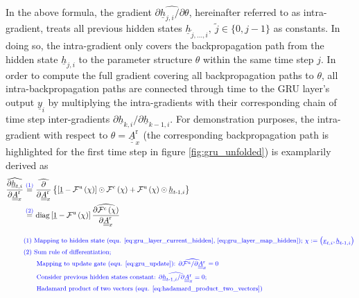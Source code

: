 In the above formula,
the gradient
$\widehat{\partial \underline h_{j, i} / \partial \theta}$,
hereinafter referred to as intra-gradient,
treats all previous hidden states 
$\underline h_{\tilde j,\dots, i}, \ \tilde j \in \{0, j-1\}$ as constants.
In doing so, the intra-gradient only covers 
the backpropagation path from 
the hidden state $\underline h_{j, i}$ to the 
parameter structure $\theta$
within the same time step $j$.
In order to compute the full gradient covering all backpropagation paths to $\theta$,
all intra-backpropagation paths are connected 
through time
to the GRU layer's output $\underline y _i$ 
by multiplying the intra-gradients with their corresponding chain of time step inter-gradients
$\partial \underline h_{k, i}/\partial \underline h_{k-1, i}$.
For demonstration purposes,
the intra-gradient with respect to 
$\theta=\underline{\underline{A}}^\text{r}_x$ 
(the corresponding backpropagation path is highlighted for the first time step in figure \ref{fig:gru_unfolded})
is examplarily derived as
\begin{align} \label{eq:gru_grad_intra_hidden_2_Arx}
    \widehat{\frac{\partial \underline h_{t, i}}{\partial \underline{\underline{A}}^\text{r}_x}}
    &\overset{\textcolor{blue}{(1)}}{=}
    \widehat{\frac{\partial}{\partial \underline{\underline{A}}^\text{r}_x}} \left\{
        \left[
            \underline 1 
            -
            \mathcal{F}^\text{u}\left(\chi\right)
        \right]
        \odot
        \mathcal{F}^\text{c} \left(\chi\right)
        +
        \mathcal{F}^\text{u}\left(\chi\right)
        \odot
        \underline h_{t\text -1,i}
    \right\}
    \nonumber \\ &\overset{\textcolor{blue}{(2)}}{=}
    \mathrm{diag} \left[
        \underline 1 
        -
        \mathcal{F}^\text{u}\left(\chi\right)
    \right]
    \widehat{
        \frac{\partial \mathcal{F}^\text{c} \left(\chi\right)}
            {\partial \underline{\underline{A}}^\text{r}_x} 
    }
    \\[2ex]
    &\textcolor{blue}{\text{\footnotesize (1) 
            Mapping to hidden state (equ. \ref{eq:gru_layer_current_hidden}, \ref{eq:gru_layer_map_hidden}); 
            $\chi :=  \left(\underline x_{t, i}, \underline h_{t\text{-}1, i}\right)$}} \nonumber \\
    &\textcolor{blue}{\text{\footnotesize (2) 
        Sum rule of differentiation;
    }} \nonumber \\
    &\textcolor{blue}{\text{\footnotesize \qquad
        Mapping to update gate (equ. \ref{eq:gru_update}): 
        $\widehat{\partial \mathcal{F}^\text{u} / \partial \underline{\underline{A}}^\text{r}_x} = 0$ 
    }} \nonumber \\
    &\textcolor{blue}{\text{\footnotesize \qquad
        Consider previous hidden states constant: 
        $\widehat{\partial \underline h_{t\text -1, i} / \partial \underline{\underline{A}}^\text{r}_x} = 0$;
    }} \nonumber \\
    &\textcolor{blue}{\text{\footnotesize \qquad
        Hadamard product of two vectors (equ. \ref{eq:hadamard_product_two_vectors})
    }} \nonumber
\end{align}
